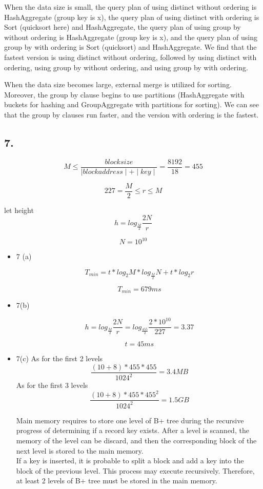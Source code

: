 \documentclass[10pt]{article}
\begin{document}
\begin{enumerate}
When the data size is small, the query plan of using distinct without ordering is HashAggregate (group key is x), the query plan of using distinct with ordering is Sort (quicksort here) and HashAggregate, the query plan of using group by without ordering is HashAggregate (group key is x), and the query plan of using group by with ordering is Sort (quicksort) and HashAggregate. We find that the fastest version is using distinct without ordering, followed by using distinct with ordering, using group by without ordering, and using group by with ordering.

When the data size becomes large, external merge is utilized for sorting. Moreover, the group by clause begins to use partitions (HashAggregate with buckets for hashing and GroupAggregate with partitions for sorting). We can see that the group by clauses run faster, and the version with ordering is the fastest.

\end{enumerate}




\subsection*{7.}

\[ M \leq \frac{blocksize}{\mid blockaddress \mid + \mid key \mid } =  \frac{8192}{18} = 455\]

\[  227 = \frac{M}{2}   \leq r \leq M \]


let height \[ h = log_\frac{M}{2} \frac{2N}{r}   \]

\[ N = 10^{10} \]
\begin{itemize}
  \item 7 (a) \newline

  \[ T_{min} =   t  *  log_{2} M  *   log_{\frac{M}{2}} N + t * log_{2} r\]

  \[ T_{min} =   679 ms\]


  \item 7(b)
  
    \[ h = log_\frac{M}{2} \frac{2N}{r} =  log_\frac{455}{2} \frac{2*10^{10}}{227} = 3.37 \]

    \[ t = 45 ms\]
  
  \item 7(c)
As for the first 2 levels    \[ \frac{(10 + 8 ) * 455 * 455 }{1024^2} = 3.4 MB\]
As for the first 3 levels    \[ \frac{(10 + 8 ) * 455 * 455^2 }{1024^2} = 1.5GB\]

Main memory requires to store one level of B+ tree during the recursive progress of determining if a record key exists. After a level is scanned, the memory of the level can be discard, and then the corresponding block of the next level is stored to the main memory.\\
If a key is inserted, it is probable to split a block and add a key into the block of the previous level. This process may execute recursively. Therefore, at least 2 levels of B+ tree must be stored in the main memory.
  
\end{itemize}
\end{document}
